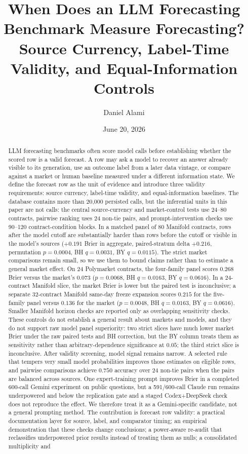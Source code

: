 \documentclass[11pt]{article}
\title{When Does an LLM Forecasting Benchmark Measure Forecasting?\\
Source Currency, Label-Time Validity, and Equal-Information Controls}
\author{Daniel Alami}
\date{June 20, 2026}
\begin{document}
\maketitle

\begin{abstract}
LLM forecasting benchmarks often score model calls before establishing whether the scored row is a valid forecast. A row may ask a model to recover an answer already visible to its generation, use an outcome label from a later data vintage, or compare against a market or human baseline measured under a different information state. We define the forecast row as the unit of evidence and introduce three validity requirements: source currency, label-time validity, and equal-information baselines. The database contains more than 20{,}000 persisted calls, but the inferential units in this paper are not calls: the central source-currency and market-control tests use 24--80 contracts, pairwise ranking uses 24 non-tie pairs, and prompt-intervention checks use 90--120 contract-condition blocks. In a matched panel of 80 Manifold contracts, rows after the model cutoff are substantially harder than rows before the cutoff or visible in the model's sources (\(+0.191\) Brier in aggregate, paired-stratum delta \(+0.216\), permutation \(p=0.0004\), BH \(q=0.0031\), BY \(q=0.0115\)). The strict market comparisons remain small, so we use them to bound claims rather than to estimate a general market effect. On 24 Polymarket contracts, the four-family panel scores \(0.268\) Brier versus the market's \(0.073\) (\(p=0.0068\), BH \(q=0.0163\), BY \(q=0.0616\)). In a 24-contract Manifold slice, the market Brier is lower but the paired test is inconclusive; a separate 32-contract Manifold same-day freeze expansion scores \(0.215\) for the five-family panel versus \(0.136\) for the market (\(p=0.0048\), BH \(q=0.0163\), BY \(q=0.0616\)). Smaller Manifold horizon checks are reported only as overlapping sensitivity checks. These controls do not establish a general result about markets and models, and they do not support raw model panel superiority: two strict slices have much lower market Brier under the raw paired tests and BH correction, but the BY column treats them as sensitivity rather than arbitrary-dependence significance at \(0.05\); the third strict slice is inconclusive. After validity screening, model signal remains narrow. A selected rule that tempers very small model probabilities improves those estimates on eligible rows, and pairwise comparisons achieve \(0.750\) accuracy over 24 non-tie pairs when the pairs are balanced across sources. One expert-training prompt improves Brier in a completed 600-call Gemini experiment on public questions, but a 591/600-call Claude run remains underpowered and below the replication gate and a staged Codex+DeepSeek check does not reproduce the effect. We therefore treat it as a Gemini-specific candidate, not a general prompting method. The contribution is forecast row validity: a practical documentation layer for source, label, and comparator timing; an empirical demonstration that these checks change conclusions; a power-aware re-audit that reclassifies underpowered prior results instead of treating them as nulls; a consolidated multiplicity and 
\end{abstract}
\end{document}
